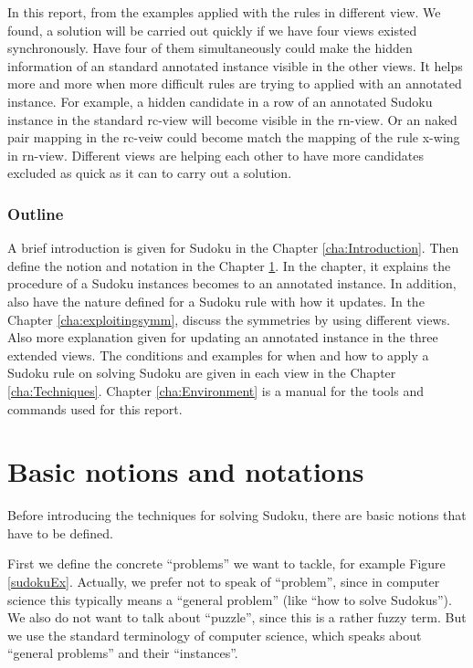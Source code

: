 \documentclass[11pt]{report}
\begin{document}
In this report, from the examples applied with the rules in different view. We found, a solution will be carried out quickly if we have four views existed synchronously. Have four of them simultaneously could make the hidden information of an standard annotated instance visible in the other views. It helps more and more when more difficult rules are trying to applied with an annotated instance. For example, a hidden candidate in a row of an annotated Sudoku instance in the standard rc-view will become visible in the rn-view. Or an naked pair mapping in the rc-veiw could become match the mapping of the rule x-wing in rn-view. Different views are helping each other to have more candidates excluded as quick as it can to carry out a solution.



\subsection{Outline}
\label{sec:Outline}

A brief introduction is given for Sudoku in the Chapter \ref{cha:Introduction}. Then define the notion and notation in the Chapter \ref{cha:basicnotnotat}. In the chapter, it explains the procedure of a Sudoku instances becomes to an annotated instance. In addition, also have the nature defined for a Sudoku rule with how it updates. In the Chapter \ref{cha:exploitingsymm}, discuss the symmetries by using different views. Also more explanation given for updating an annotated instance in the three extended views. The conditions and examples for when and how to apply a Sudoku rule on solving Sudoku are given in each view in the Chapter \ref{cha:Techniques}. Chapter \ref{cha:Environment} is a manual for the tools and commands used for this report.



\chapter{Basic notions and notations}
\label{cha:basicnotnotat}

Before introducing the techniques for solving Sudoku, there are basic notions that have to be defined.

First we define the concrete ``problems'' we want to tackle, for example Figure \ref{sudokuEx}. Actually, we prefer not to speak of ``problem'', since in computer science this typically means a ``general problem'' (like ``how to solve Sudokus''). We also do not want to talk about ``puzzle'', since this is a rather fuzzy term. But we use the standard terminology of computer science, which speaks about ``general problems'' and their ``instances''.
\end{document}
